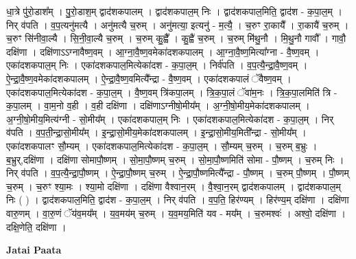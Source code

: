 \documentclass[17pt]{extarticle}
\begin{document}
धा॒त्रे पु॑रो॒डाश᳚म् । पु॒रो॒डाश॒म् द्वाद॑शकपालम् । द्वाद॑शकपाल॒म् निः । द्वाद॑शकपाल॒मिति॒ द्वाद॑श - क॒पा॒ल॒म् । निर् व॑पति । व॒प॒त्यनु॑मत्यै । अनु॑मत्यै च॒रुम् । अनु॑मत्या॒ इत्यनु॑ - म॒त्यै॒ । च॒रुꣳ रा॒कायै᳚ । रा॒कायै॑ च॒रुम् । च॒रुꣳ सि॑नीवा॒ल्यै । सि॒नी॒वा॒ल्यै च॒रुम् । च॒रुम् कु॒ह्वै᳚ । कु॒ह्वै॑ च॒रुम् । च॒रुम् मि॑थु॒नौ । मि॒थु॒नौ गावौ᳚ । गावौ॒ दक्षि॑णा । दक्षि॑णाऽऽग्नावैष्ण॒वम् । आ॒ग्ना॒वै॒ष्ण॒वमेका॑दशकपालम् । आ॒ग्ना॒वै॒ष्ण॒मित्या᳚ग्ना - वै॒ष्ण॒वम् । एका॑दशकपाल॒म् निः । एका॑दशकपाल॒मित्येका॑दश - क॒पा॒ल॒म् । निर्व॑पति । व॒प॒त्यै॒न्द्रा॒वै॒ष्ण॒वम् । ऐ॒न्द्रा॒वै॒ष्ण॒वमेका॑दशकपालम् । ऐ॒न्द्रा॒वै॒ष्ण॒वमित्यै᳚न्द्रा - वै॒ष्ण॒वम् । एका॑दशकपालं ॅवैष्ण॒वम् । एका॑दशकपाल॒मित्येका॑दश - क॒पा॒ल॒म् । वै॒ष्ण॒वम् त्रि॑कपा॒लम् । त्रि॒क॒पा॒लं ॅवा॑म॒नः । त्रि॒क॒पा॒लमिति॑ त्रि - क॒पा॒लम् । वा॒म॒नो व॒ही । व॒ही दक्षि॑णा । दक्षि॑णाऽग्नीषो॒मीय᳚म् । अ॒ग्नी॒षो॒मीय॒मेका॑दशकपालम् । अ॒ग्नी॒षो॒मीय॒मित्य॑ग्नी - सो॒मीय᳚म् । एका॑दशकपाल॒म् निः । एका॑दशकपाल॒मित्येका॑दश - क॒पा॒ल॒म् । निर् व॑पति । व॒प॒ती॒न्द्रा॒सो॒मीय᳚म् । इ॒न्द्रा॒सो॒मीय॒मेका॑दशकपालम् । इ॒न्द्रा॒सो॒मीय॒मिती᳚न्द्रा - सो॒मीय᳚म् । एका॑दशकपालꣳ सौ॒म्यम् । एका॑दशकपाल॒मित्येका॑दश - क॒पा॒ल॒म् । सौ॒म्यम् च॒रुम् । च॒रुम् ब॒भ्रुः । ब॒भ्रुर्,दक्षि॑णा । दक्षि॑णा सोमापौ॒ष्णम् । सो॒मा॒पौ॒ष्णम् च॒रुम् । सो॒मा॒पौ॒ष्णमिति॑ सोमा - पौ॒ष्णम् । च॒रुम् निः । निर् व॑पति । व॒प॒त्यै॒न्द्रा॒पौ॒ष्णम् । ऐ॒न्द्रा॒पौ॒ष्णम् च॒रुम् । ऐ॒न्द्रा॒पौ॒ष्णमित्यै᳚न्द्रा - पौ॒ष्णम् । च॒रुम् पौ॒ष्णम् । पौ॒ष्णम् च॒रुम् । च॒रुꣳ श्या॒मः । श्या॒मो दक्षि॑णा । दक्षि॑णा वैश्वान॒रम् । वै॒श्वा॒न॒रम् द्वाद॑शकपालम् । द्वाद॑शकपाल॒म् निः ( ) । द्वाद॑शकपाल॒मिति॒ द्वाद॑श - क॒पा॒ल॒म् । निर् व॑पति । व॒प॒ति॒ हिर॑ण्यम् । हिर॑ण्य॒म् दक्षि॑णा । दक्षि॑णा वारु॒णम् । वा॒रु॒णं ॅय॑व॒मय᳚म् । य॒व॒मय॑म् च॒रुम् । य॒व॒मय॒मिति॑ यव - मय᳚म् । च॒रुमश्वः॑ । अश्वो॒ दक्षि॑णा । दक्षि॒णेति॒ दक्षि॑णा । \newline

\textbf{Jatai Paata} \newline
\end{document}
